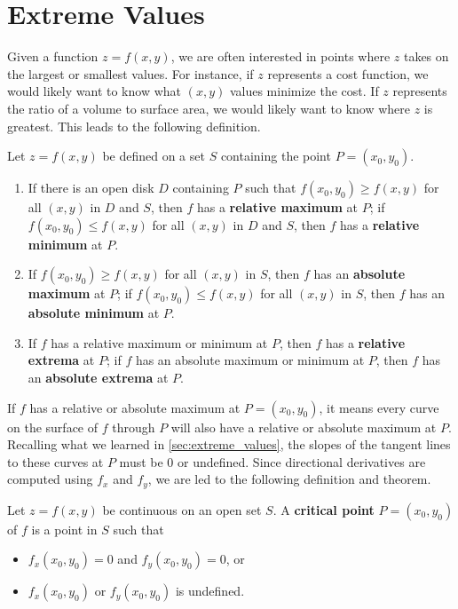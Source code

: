 \section{Extreme Values}\label{sec:multi_extreme_values}

Given a function $z=f(x,y)$, we are often interested in points where $z$ takes on the largest or smallest values. For instance, if $z$ represents a cost function, we would likely want to know what $(x,y)$ values minimize the cost. If $z$ represents the ratio of a volume to surface area, we would likely want to know where $z$ is greatest. This leads to the following definition.

{Let $z=f(x,y)$ be defined on a set $S$ containing the point $P=(x_0,y_0)$.
\begin{enumerate}
	\item If there is an open disk $D$ containing $P$ such that $f(x_0,y_0) \geq f(x,y)$ for all $(x,y)$ in $D$ and $S$, then $f$ has a \textbf{relative maximum} at $P$; if $f(x_0,y_0) \leq f(x,y)$ for all $(x,y)$ in $D$ and $S$, then $f$ has a \textbf{relative minimum} at $P$.
	
	\item	If $f(x_0,y_0)\geq f(x,y)$ for all $(x,y)$ in $S$, then $f$ has an \textbf{absolute maximum} at $P$; if $f(x_0,y_0)\leq f(x,y)$ for all $(x,y)$ in $S$, then $f$ has an \textbf{absolute minimum} at $P$.
	
	\item		If $f$ has a relative maximum or minimum at $P$, then $f$ has a \textbf{relative extrema} at $P$; if $f$ has an absolute maximum or minimum at $P$, then $f$ has an \textbf{absolute extrema} at $P$.
\end{enumerate}}

If $f$ has a relative or absolute maximum at $P=(x_0,y_0)$, it means every curve on the surface of $f$ through $P$ will also have a relative or absolute maximum at $P$. Recalling what we learned in \autoref{sec:extreme_values}, the slopes of the tangent lines to these curves at $P$ must be 0 or undefined. Since directional derivatives are computed using $f_x$ and $f_y$, we are led to the following definition and theorem.

{Let $z = f(x,y)$ be continuous on an open set $S$. A \textbf{critical point} $P=(x_0,y_0)$ of $f$ is a point in $S$ such that 
\begin{itemize}
	\item $f_x(x_0,y_0) = 0$ and $f_y(x_0,y_0) = 0$, or
	\item	$f_x(x_0,y_0)$ or $f_y(x_0,y_0)$ is undefined.
\end{itemize}}

